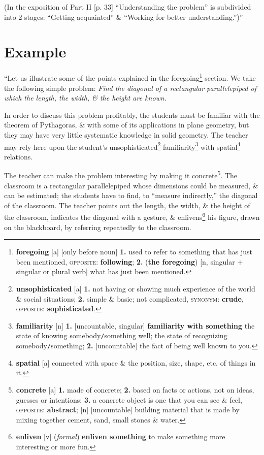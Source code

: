 \documentclass[oneside]{book}
\numberwithin{equation}{section}
\begin{document}
(In the exposition of Part II [p. 33] ``Understanding the problem'' is subdivided into 2 stages: ``Getting acquainted'' \& ``Working for better understanding.'')'' -- \cite[pp. 6--7]{Polya2014}

\section{Example}
``Let us illustrate some of the points explained in the foregoing\footnote{\textbf{foregoing} [a] [only before noun] \textbf{1.} used to refer to something that has just been mentioned, \textsc{opposite}: \textbf{following}; \textbf{2.} (\textbf{the foregoing}) [n, singular $+$ singular or plural verb] what has just been mentioned.} section. We take the following simple problem: \textit{Find the diagonal of a rectangular parallelepiped of which the length, the width, \& the height are known}.

In order to discuss this problem profitably, the students must be familiar with the theorem of Pythagoras, \& with some of its applications in plane geometry, but they may have very little systematic knowledge in solid geometry. The teacher may rely here upon the student's unsophisticated\footnote{\textbf{unsophisticated} [a] \textbf{1.} not having or showing much experience of the world \&  social situations; \textbf{2.} simple \& basic; not complicated, \textsc{synonym}: \textbf{crude}, \textsc{opposite}: \textbf{sophisticated}.} familiarity\footnote{\textbf{familiarity} [n] \textbf{1.} [uncountable, singular] \textbf{familiarity with something} the state of knowing somebody\texttt{/}something well; the state of recognizing somebody\texttt{/}something; \textbf{2.} [uncountable] the fact of being well known to you.} with spatial\footnote{\textbf{spatial} [a] connected with space \& the position, size, shape, etc. of things in it.} relations.

The teacher can make the problem interesting by making it concrete\footnote{\textbf{concrete} [a] \textbf{1.} made of concrete; \textbf{2.} based on facts or actions, not on ideas, guesses or intentions; \textbf{3.} a concrete object is one that you can see \& feel, \textsc{opposite}: \textbf{abstract}; [n] [uncountable] building material that is made by mixing together cement, sand, small stones \& water.}. The classroom is a rectangular parallelepiped whose dimensions could be measured, \& can be estimated; the students have to find, to ``measure indirectly,'' the diagonal of the classroom. The teacher points out the length, the width, \& the height of the classroom, indicates the diagonal with a gesture, \& enlivens\footnote{\textbf{enliven} [v] (\textit{formal}) \textbf{enliven something} to make something more interesting or more fun.} his figure, drawn on the blackboard, by referring repeatedly to the classroom.
\end{document}
